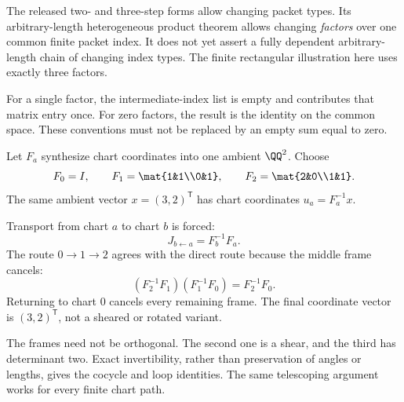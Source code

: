 The released two- and three-step forms allow changing packet types. Its arbitrary-length heterogeneous product theorem allows changing \emph{factors} over one common finite packet index. It does not yet assert a fully dependent arbitrary-length chain of changing index types. The finite rectangular illustration here uses exactly three factors.

For a single factor, the intermediate-index list is empty and contributes that matrix entry once. For zero factors, the result is the identity on the common space. These conventions must not be replaced by an empty sum equal to zero.


Let $F_a$ synthesize chart coordinates into one ambient $\QQ^2$. Choose
\[
F_0=I,\qquad F_1=\mat{1&1\\0&1},\qquad
F_2=\mat{2&0\\1&1}.
\]
The same ambient vector $x=(3,2)^\mathsf T$ has chart coordinates $u_a=F_a^{-1}x$.


Transport from chart $a$ to chart $b$ is forced:
\[
J_{b\leftarrow a}=F_b^{-1}F_a.
\]
The route $0\to1\to2$ agrees with the direct route because the middle frame cancels:
\[
(F_2^{-1}F_1)(F_1^{-1}F_0)=F_2^{-1}F_0.
\]
Returning to chart $0$ cancels every remaining frame. The final coordinate vector is $(3,2)^\mathsf T$, not a sheared or rotated variant.

The frames need not be orthogonal. The second one is a shear, and the third has determinant two. Exact invertibility, rather than preservation of angles or lengths, gives the cocycle and loop identities. The same telescoping argument works for every finite chart path.


